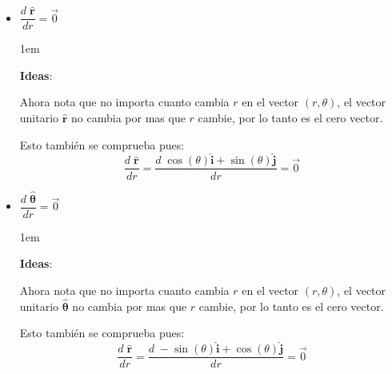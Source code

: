 \documentclass[12pt, fleqn]{report}                             %
\newenvironment{SmallIndentation}[1][0.75em]                    %
    {\begin{adjustwidth}{#1}{}\begin{footnotesize}}                 %
    {\end{footnotesize}\end{adjustwidth}}                           %
\newcommand{\Wrap}[1]{\left( #1 \right)}                        %
\newcommand{\uVec}[1]{\boldsymbol{\hat{\textbf{$#1$}}}}         %
\newcommand{\Cos}[1]{\cos\Wrap{#1}}                             %
\newcommand{\Sin}[1]{\sin\Wrap{#1}}                             %
\newcommand \Derivate[2]                                        %
        {\dfrac{d \; #1}{d #2}}                                     %
\newcommand \Partial[2]                                        %
        {\dfrac{\partial \; #1}{\partial #2}}                      %
\begin{document}
                \begin{itemize}
                    
                    \item 
                        $\Derivate{\uVec{r}}{r} = \vec{0}$
                        
                        \begin{SmallIndentation}[1em]
                            \textbf{Ideas}:

                            Ahora nota que no importa cuanto cambia $r$ en el vector $(r, \theta)$, el vector
                            unitario $\uVec{r}$ no cambia por mas que $r$ cambie, por lo tanto es el cero
                            vector.

                            Esto también se comprueba pues:
                            \begin{equation*}
                                \Derivate{\uVec{r}}{r}                                        =
                                \Derivate{\Cos{\theta}\uVec{i} + \Sin{\theta} \uVec{j}}{r}   =
                                \vec{0}
                            \end{equation*}
                        \end{SmallIndentation}

                    \item
                        $\Derivate{\uVec{\theta}}{r} = \vec{0}$
                        
                        \begin{SmallIndentation}[1em]
                            \textbf{Ideas}:

                            Ahora nota que no importa cuanto cambia $r$ en el vector $(r, \theta)$, el vector
                            unitario $\uVec{\theta}$ no cambia por mas que $r$ cambie, por lo tanto es el
                            cero vector.

                            Esto también se comprueba pues:
                            \begin{equation*}
                                \Derivate{\uVec{r}}{r}                                        =
                                \Derivate{-\Sin{\theta}\uVec{i} + \Cos{\theta} \uVec{j}}{r}  =
                                \vec{0}
                            \end{equation*}


\end{SmallIndentation}
\end{itemize}
\end{document}
